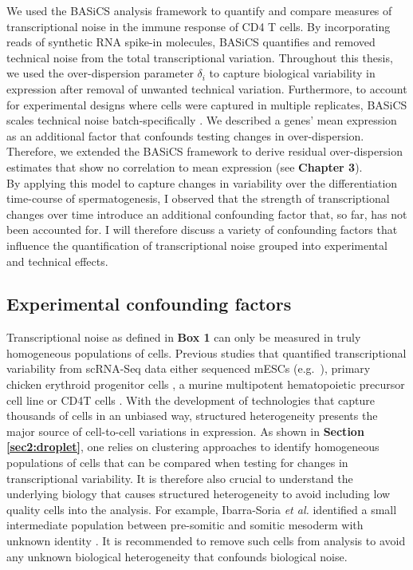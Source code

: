 We used the BASiCS analysis framework to quantify and compare measures of transcriptional noise in the immune response of CD4\plus{} T cells. By incorporating reads of synthetic RNA spike-in molecules, BASiCS quantifies and removed technical noise from the total transcriptional variation. Throughout this thesis, we used the over-dispersion parameter $\delta_i$ to capture biological variability in expression after removal of unwanted technical variation. Furthermore, to account for experimental designs where cells were captured in multiple replicates, BASiCS scales technical noise batch-specifically  \citep{Vallejos2015BASiCS}. We described a genes' mean expression as an additional factor that confounds testing changes in over-dispersion. Therefore, we extended the BASiCS framework to derive residual over-dispersion estimates that show no correlation to mean expression (see \textbf{Chapter 3}). \\

By applying this model to capture changes in variability over the differentiation time-course of spermatogenesis, I observed that the strength of transcriptional changes over time introduce an additional confounding factor that, so far, has not been accounted for. I will therefore discuss a variety of confounding factors that influence the quantification of transcriptional noise grouped into experimental and technical effects.

\subsection{Experimental confounding factors}

Transcriptional noise as defined in \textbf{Box 1} can only be measured in truly homogeneous populations of cells. Previous studies that quantified transcriptional variability from scRNA-Seq data either sequenced mESCs (e.g.~\citep{Kolodziejczyk2015cell}), primary chicken erythroid progenitor cells \citep{Richard2016}, a murine multipotent hematopoietic precursor cell line \citep{Mojtahedi2016} or CD4\plus T cells \citep{Martinez-jimenez2017}. With the development of technologies that capture thousands of cells in an unbiased way, structured heterogeneity presents the major source of cell-to-cell variations in expression. As shown in \textbf{Section \ref{sec2:droplet}}, one relies on clustering approaches to identify homogeneous populations of cells that can be compared when testing for changes in transcriptional variability. It is therefore also crucial to understand the underlying biology that causes structured heterogeneity to avoid including low quality cells into the analysis. For example, Ibarra-Soria \emph{et al.} identified a small intermediate population between pre-somitic and somitic mesoderm with unknown identity \citep{Ibarra-Soria2018}. It is recommended to remove such cells from analysis to avoid any unknown biological heterogeneity that confounds biological noise.\\
 

